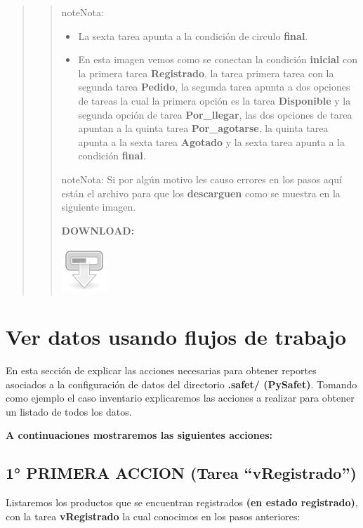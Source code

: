 \documentclass[letterpaper,11pt,spanish]{sphinxmanual}
\begin{document}
\begin{quote}
\begin{quote}
\begin{notice}{note}{Nota:}
\begin{itemize}
\item {} 
La sexta tarea apunta a la condición de circulo \textbf{final}.

\item {} 
En esta imagen vemos como se conectan la condición  \textbf{inicial} con la primera tarea \textbf{Registrado}, la tarea primera tarea con la segunda tarea \textbf{Pedido}, la segunda tarea apunta a dos opciones de tareas la cual la primera opción es la tarea \textbf{Disponible} y la segunda opción de tarea \textbf{Por\_llegar}, las dos opciones de tarea apuntan a la quinta tarea \textbf{Por\_agotarse}, la quinta tarea apunta a la sexta tarea \textbf{Agotado} y la sexta tarea apunta a la condición \textbf{final}.

\end{itemize}
\end{notice}

\begin{notice}{note}{Nota:}
Si por algún motivo les causo errores en los pasos aquí están el archivo para que los \textbf{descarguen} como se muestra en la siguiente imagen.
\end{notice}

\textbf{DOWNLOAD:}

\includegraphics{download1.png}

\end{quote}
\end{quote}


\chapter{Ver datos usando flujos de trabajo}
\label{_templates/Contenido6/Parte3:ver-datos-usando-flujos-de-trabajo}\label{_templates/Contenido6/Parte3::doc}
En esta sección de explicar las acciones necesarias para obtener reportes asociados a la configuración de datos del directorio \textbf{.safet/ (PySafet)}. Tomando como ejemplo el caso inventario explicaremos las acciones a realizar para obtener un listado de todos los datos.

\textbf{A continuaciones mostraremos las siguientes acciones:}


\section{1° PRIMERA ACCION (Tarea ``vRegistrado'')}
\label{_templates/Contenido6/Parte3:primera-accion-tarea-vregistrado}
Listaremos los productos que se encuentran registrados \textbf{(en estado registrado)}, con la tarea \textbf{vRegistrado} la cual conocimos en los pasos anteriores:
\end{document}
